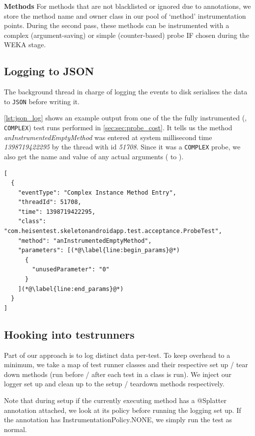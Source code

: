 \textbf{Methods} For methods that are not blacklisted or ignored due to
annotations, we store the method name and owner class in our pool of
{\lq}method{\rq} instrumentation points. During the second pass, these methods
can be instrumented with a complex (argument-saving) or simple (counter-based)
probe IF chosen during the WEKA stage.

\subsection{Logging to JSON}

The background thread in charge of logging the events to disk serialises the
data to {\tt JSON} before writing it.

\autoref{lst:json_log} shows an example output from one of the the fully
instrumented (\ie, {\tt COMPLEX}) test runs performed in
\autoref{sec:sec:probe_cost}. It tells us the method
\textit{anInstrumentedEmptyMethod} was entered at system millisecond time
\textit{1398719422295} by the thread with id \textit{51708}. Since it was a
{\tt COMPLEX} probe, we also get the name and value of any actual arguments
( to ).

\begin{lstlisting}[label=lst:json_log]
[
  {
    "eventType": "Complex Instance Method Entry",
    "threadId": 51708,
    "time": 1398719422295,
    "class": "com.heisentest.skeletonandroidapp.test.acceptance.ProbeTest",
    "method": "anInstrumentedEmptyMethod",
    "parameters": [(*@\label{line:begin_params}@*)
      {
        "unusedParameter": "0"
      }
    ](*@\label{line:end_params}@*)
  }
]
\end{lstlisting}

\subsection{Hooking into testrunners}

Part of our approach is to log distinct data per-test. To keep overhead to a
minimum, we take a map of test runner classes and their respective set up / tear
down methods (run before / after each test in a class is run). We inject our
logger set up and clean up to the setup / teardown methods respectively.

Note that during setup if the currently executing method has a @Splatter
annotation attached, we look at its policy before running the logging set up. If
the annotation has InstrumentationPolicy.NONE, we simply run the test as normal.

